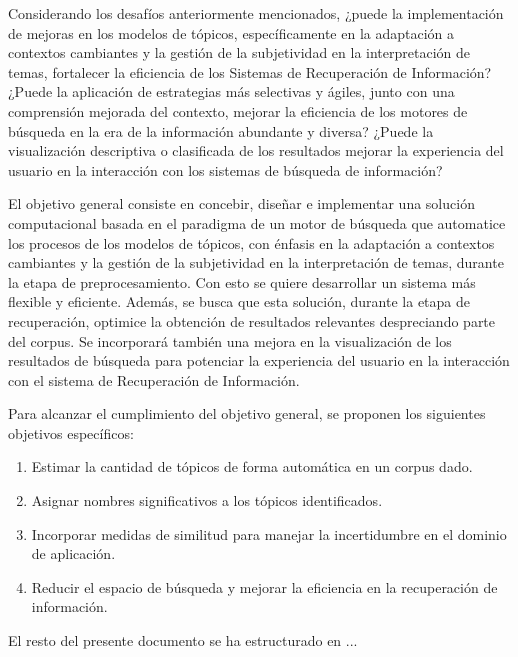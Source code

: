 Considerando los desafíos anteriormente mencionados, ¿puede la implementación de mejoras en los modelos de tópicos, específicamente en la adaptación a contextos cambiantes y la gestión de la subjetividad en la interpretación de temas, fortalecer la eficiencia de los Sistemas de Recuperación de Información? ¿Puede la aplicación de estrategias más selectivas y ágiles, junto con una comprensión mejorada del contexto, mejorar la eficiencia de los motores de búsqueda en la era de la información abundante y diversa? ¿Puede la visualización descriptiva o clasificada de los resultados mejorar la experiencia del usuario en la interacción con los sistemas de búsqueda de información?

El objetivo general consiste en concebir, diseñar e implementar una solución computacional basada en el paradigma de un motor de búsqueda que automatice los procesos de los modelos de tópicos, con énfasis en la adaptación a contextos cambiantes y la gestión de la subjetividad en la interpretación de temas, durante la etapa de preprocesamiento. Con esto se quiere desarrollar un sistema más flexible y eficiente. Además, se busca que esta solución, durante la etapa de recuperación, optimice la obtención de resultados relevantes despreciando parte del corpus. Se incorporará también una mejora en la visualización de los resultados de búsqueda para potenciar la experiencia del usuario en la interacción con el sistema de Recuperación de Información.

Para alcanzar el cumplimiento del objetivo general, se proponen los siguientes objetivos específicos:

\begin{enumerate}
	\item Estimar la cantidad de tópicos de forma autom\'atica en un corpus dado.
	
	\item Asignar nombres significativos a los tópicos identificados.
	
	\item Incorporar medidas de similitud para manejar la incertidumbre en el dominio de aplicación.
	
	\item Reducir el espacio de búsqueda y mejorar la eficiencia en la recuperación de información.
\end{enumerate}

El resto del presente documento se ha estructurado en ... 
